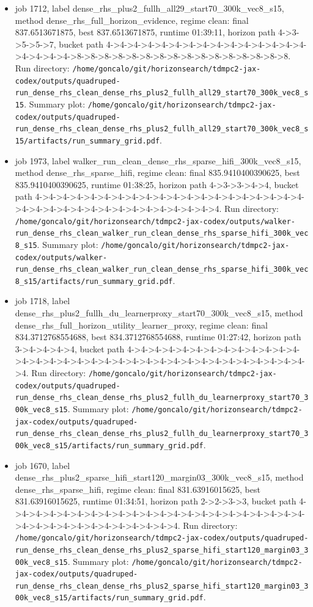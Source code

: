 \begin{itemize}
\item job 1712, label dense\_rhs\_plus2\_fullh\_all29\_start70\_300k\_vec8\_s15, method dense\_rhs\_full\_horizon\_evidence, regime clean: final 837.6513671875, best 837.6513671875, runtime 01:39:11, horizon path 4->3->5->5->7, bucket path 4->4->4->4->4->4->4->4->4->4->4->4->4->4->4->4->4->4->4->8->8->8->8->8->8->8->8->8->8->8->8->8->8->8->8. Run directory: \texttt{/home/goncalo/git/horizonsearch/tdmpc2-jax-codex/outputs/quadruped-run\_dense\_rhs\_clean\_dense\_rhs\_plus2\_fullh\_all29\_start70\_300k\_vec8\_s15}. Summary plot: \texttt{/home/goncalo/git/horizonsearch/tdmpc2-jax-codex/outputs/quadruped-run\_dense\_rhs\_clean\_dense\_rhs\_plus2\_fullh\_all29\_start70\_300k\_vec8\_s15/artifacts/run\_summary\_grid.pdf}.
\item job 1973, label walker\_run\_clean\_dense\_rhs\_sparse\_hifi\_300k\_vec8\_s15, method dense\_rhs\_sparse\_hifi, regime clean: final 835.9410400390625, best 835.9410400390625, runtime 01:38:25, horizon path 4->3->3->4->4, bucket path 4->4->4->4->4->4->4->4->4->4->4->4->4->4->4->4->4->4->4->4->4->4->4->4->4->4->4->4->4->4->4->4->4->4->4. Run directory: \texttt{/home/goncalo/git/horizonsearch/tdmpc2-jax-codex/outputs/walker-run\_dense\_rhs\_clean\_walker\_run\_clean\_dense\_rhs\_sparse\_hifi\_300k\_vec8\_s15}. Summary plot: \texttt{/home/goncalo/git/horizonsearch/tdmpc2-jax-codex/outputs/walker-run\_dense\_rhs\_clean\_walker\_run\_clean\_dense\_rhs\_sparse\_hifi\_300k\_vec8\_s15/artifacts/run\_summary\_grid.pdf}.
\item job 1718, label dense\_rhs\_plus2\_fullh\_du\_learnerproxy\_start70\_300k\_vec8\_s15, method dense\_rhs\_full\_horizon\_utility\_learner\_proxy, regime clean: final 834.3712768554688, best 834.3712768554688, runtime 01:27:42, horizon path 3->4->4->4->4, bucket path 4->4->4->4->4->4->4->4->4->4->4->4->4->4->4->4->4->4->4->4->4->4->4->4->4->4->4->4->4->4->4->4->4->4->4. Run directory: \texttt{/home/goncalo/git/horizonsearch/tdmpc2-jax-codex/outputs/quadruped-run\_dense\_rhs\_clean\_dense\_rhs\_plus2\_fullh\_du\_learnerproxy\_start70\_300k\_vec8\_s15}. Summary plot: \texttt{/home/goncalo/git/horizonsearch/tdmpc2-jax-codex/outputs/quadruped-run\_dense\_rhs\_clean\_dense\_rhs\_plus2\_fullh\_du\_learnerproxy\_start70\_300k\_vec8\_s15/artifacts/run\_summary\_grid.pdf}.
\item job 1670, label dense\_rhs\_plus2\_sparse\_hifi\_start120\_margin03\_300k\_vec8\_s15, method dense\_rhs\_sparse\_hifi, regime clean: final 831.63916015625, best 831.63916015625, runtime 01:34:51, horizon path 2->2->3->3, bucket path 4->4->4->4->4->4->4->4->4->4->4->4->4->4->4->4->4->4->4->4->4->4->4->4->4->4->4->4->4->4->4->4->4->4. Run directory: \texttt{/home/goncalo/git/horizonsearch/tdmpc2-jax-codex/outputs/quadruped-run\_dense\_rhs\_clean\_dense\_rhs\_plus2\_sparse\_hifi\_start120\_margin03\_300k\_vec8\_s15}. Summary plot: \texttt{/home/goncalo/git/horizonsearch/tdmpc2-jax-codex/outputs/quadruped-run\_dense\_rhs\_clean\_dense\_rhs\_plus2\_sparse\_hifi\_start120\_margin03\_300k\_vec8\_s15/artifacts/run\_summary\_grid.pdf}.

\end{itemize}
